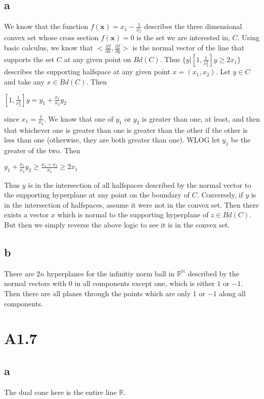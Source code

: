 \documentclass{article}
\begin{document}
\subsection*{a}
We know that the function $f(\textbf{x}) = x_1 - \frac{1}{x_2}$ describes the three dimensional convex set whose cross section $f(\textbf{x}) = 0$ is the set we are interested in, $C$.  Using basic calculus, we know that $<\frac{\partial f}{\partial x}, \frac{\partial f}{\partial y}>$ is the normal vector of the line that supports the set $C$ at any given point on $Bd(C)$.  Thus $\{y | [1, \frac{1}{x_2^2}] y \geq 2x_1\}$ describes the supporting halfspace at any given point $x = (x_1, x_2)$.  Let $y \in C$ and take any $x \in Bd(C)$.  Then
\begin{center}
    $[1, \frac{1}{x_2^2}] y = y_1 + \frac{x_1}{x_2}y_2$
\end{center}
since $x_1 = \frac{1}{x_2}$. We know that one of $y_1$ or $y_2$ is greater than one, at least, and then that whichever one is greater than one is greater than the other if the other is less than one (otherwise, they are both greater than one).   WLOG let $y_1$ be the greater of the two. Then
\begin{center}
    $y_1 + \frac{x_1}{x_2}y_2 \geq \frac{x_1 + x_2}{x_2} \geq 2x_1$
\end{center}
Thus $y$ is in the intersection of all halfspaces described by the normal vector to the supporting hyperplane at any point on the boundary of $C$.  Conversely, if $y$ is in the intersection of halfspaces, assume it were not in the convex set.  Then there exists a vector $x$ which is normal to the supporting hyperplane of $z \in Bd(C)$. But then we simply reverse the above logic to see it is in the convex set.
\subsection*{b}
There are $2n$ hyperplanes for the infinitiy norm ball in $\mathbb{R^N}$ described by the normal vectors with $0$ in all components except one, which is either $1$ or $-1$.  Then there are all planes through the points which are only $1$ or $-1$ along all components.
\section*{A1.7}
\subsection*{a} The dual cone here is the entire line $\mathbb{R}$.
\end{document}
